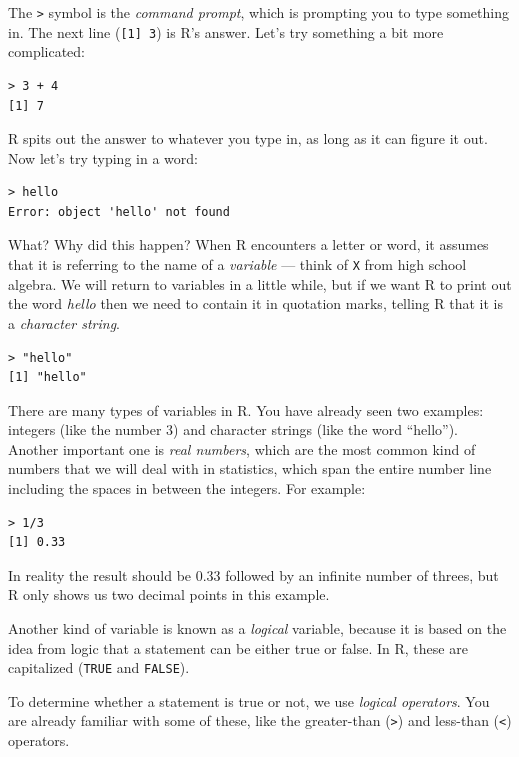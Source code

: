 \documentclass[
  12pt,
]{book}
\begin{document}
The \texttt{\textgreater{}} symbol is the \emph{command prompt}, which is prompting you to type something in. The next line (\texttt{{[}1{]}\ 3}) is R's answer. Let's try something a bit more complicated:

\begin{verbatim}
> 3 + 4
[1] 7
\end{verbatim}

R spits out the answer to whatever you type in, as long as it can figure it out. Now let's try typing in a word:

\begin{verbatim}
> hello
Error: object 'hello' not found
\end{verbatim}

What? Why did this happen? When R encounters a letter or word, it assumes that it is referring to the name of a \emph{variable} --- think of \texttt{X} from high school algebra. We will return to variables in a little while, but if we want R to print out the word \emph{hello} then we need to contain it in quotation marks, telling R that it is a \emph{character string}.

\begin{verbatim}
> "hello"
[1] "hello"
\end{verbatim}

There are many types of variables in R. You have already seen two examples: integers (like the number 3) and character strings (like the word ``hello''). Another important one is \emph{real numbers}, which are the most common kind of numbers that we will deal with in statistics, which span the entire number line including the spaces in between the integers. For example:

\begin{verbatim}
> 1/3
[1] 0.33
\end{verbatim}

In reality the result should be 0.33 followed by an infinite number of threes, but R only shows us two decimal points in this example.

Another kind of variable is known as a \emph{logical} variable, because it is based on the idea from logic that a statement can be either true or false. In R, these are capitalized (\texttt{TRUE} and \texttt{FALSE}).

To determine whether a statement is true or not, we use \emph{logical operators}. You are already familiar with some of these, like the greater-than (\texttt{\textgreater{}}) and less-than (\texttt{\textless{}}) operators.
\end{document}
